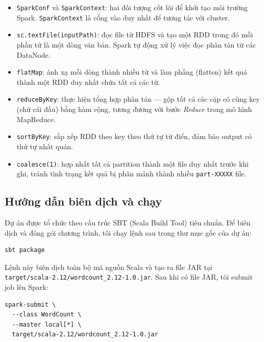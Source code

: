 \documentclass[12pt]{article}
\begin{document}
\begin{itemize}
  \item \texttt{SparkConf} và \texttt{SparkContext}: hai đối
        tượng cốt lõi để khởi tạo môi trường Spark. \texttt{SparkContext}
        là cổng vào duy nhất để tương tác với cluster.

  \item \texttt{sc.textFile(inputPath)}: đọc file từ HDFS và tạo một RDD
        trong đó mỗi phần tử là một dòng văn bản. Spark tự động xử lý việc đọc phân
        tán từ các DataNode.

  \item \texttt{flatMap}: ánh xạ mỗi dòng thành nhiều từ và làm phẳng
        (flatten) kết quả thành một RDD duy nhất chứa tất cả các từ.

  \item \texttt{reduceByKey}: thực hiện tổng hợp phân tán — gộp tất cả
        các cặp có cùng key (chữ cái đầu) bằng hàm cộng, tương đương với bước
        \textit{Reduce} trong mô hình MapReduce.

  \item \texttt{sortByKey}: sắp xếp RDD theo key theo thứ tự từ điển,
        đảm bảo output có thứ tự nhất quán.

  \item \texttt{coalesce(1)}: hợp nhất tất cả partition thành một file
        duy nhất trước khi ghi, tránh tình trạng kết quả bị phân mảnh thành nhiều
        \texttt{part-XXXXX} file.
\end{itemize}

\subsection{Hướng dẫn biên dịch và chạy}

Dự án được tổ chức theo cấu trúc SBT (Scala Build Tool) tiêu chuẩn. Để biên dịch
và đóng gói chương trình, tôi chạy lệnh sau trong thư mục gốc của dự án:

\begin{verbatim}
sbt package
\end{verbatim}

Lệnh này biên dịch toàn bộ mã nguồn Scala và tạo ra file JAR tại
\texttt{target/scala-2.12/wordcount\_2.12-1.0.jar}. Sau khi có file JAR, tôi submit
job lên Spark:

\begin{verbatim}
spark-submit \
  --class WordCount \
  --master local[*] \
  target/scala-2.12/wordcount_2.12-1.0.jar
\end{verbatim}
\end{document}
